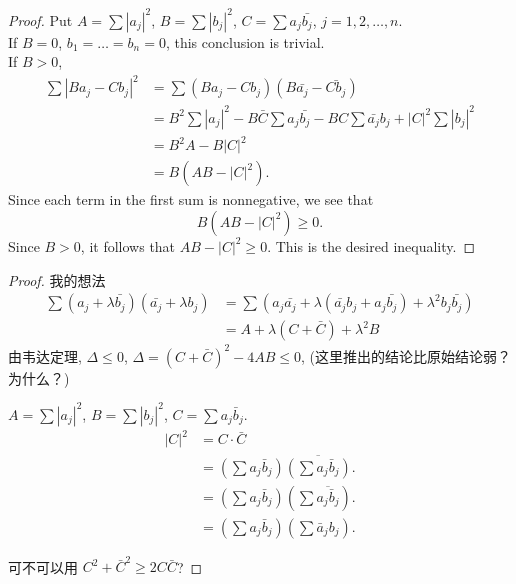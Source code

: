 \begin{proof}
    Put $A = \sum |a_j|^2$, $B = \sum |b_j|^2$, $C = \sum a_j \bar{b_j}$, $j = 1,2,\dots,n$. \\    
    If $B = 0$, $b_1 = \dots = b_n = 0$, this conclusion is trivial.\\
    If $B > 0$, 
    \begin{align*}
        \sum \left|B a_j - C b_j\right|^2
        &= \sum (B a_j-C b_j)(B \bar{a_j} - \bar{C b_j})\\
        &= B^2\sum \left|a_j\right|^2 - B\bar{C}\sum a_j \bar{b_j} - BC \sum \bar{a_j} b_j + \left|C\right|^2\sum |b_j|^2\\
        &= B^2A-B|C|^2\\
        &= B(AB-|C|^2).
    \end{align*}
    Since each term in the first sum is nonnegative, we see that
    \begin{equation*}
        B(AB-|C|^2) \geq 0.
    \end{equation*}
    Since $B>0$, it follows that $AB-|C|^2 \geq 0$. This is the desired inequality.
\end{proof}

\begin{proof}
    我的想法
    \begin{align*}
        \sum (a_j + \lambda \bar{b_j})(\bar{a_j} + \lambda b_j)
        &=\sum(
            a_j\bar{a_j}
            + \lambda(\bar{a_j}b_j+a_j\bar{b_j})
            + \lambda^2 b_j\bar{b_j}
            )\\
        &= A + \lambda (C + \bar{C}) + \lambda^{2} B
    \end{align*}
    由韦达定理, $\Delta \leq 0$, 
    $\Delta = (C + \bar{C})^2-4AB \leq 0$, 
    (这里推出的结论比原始结论弱？为什么？)

    $A = \sum \left| a_j \right|^2 $,
    $B = \sum \left| b_j \right|^2 $,
    $C = \sum a_j \bar{b}_j$.
    \begin{align*}
        \left| C \right|^2 
        &= C \cdot \bar{C}\\
        &= \left( \sum a_j \bar{b}_j \right) 
        \overline{\left( \sum a_j \bar{b}_j \right)}.\\
        &= \left( \sum a_j \bar{b}_j \right) 
        \left( \sum \overline{a_j \bar{b}_j} \right).\\
        &= \left( \sum a_j \bar{b}_j \right) 
        \left( \sum \bar{a}_j {b}_j \right).
    \end{align*}

    可不可以用 $C^2 + \bar{C}^2 \geq 2 C \bar{C}$?
\end{proof}